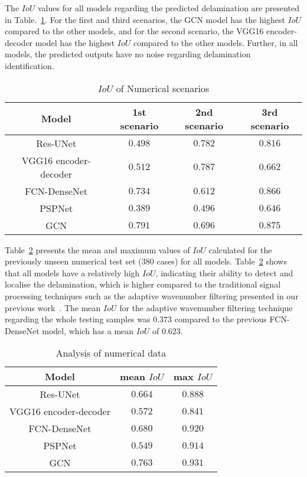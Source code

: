 \clearpage
The \(IoU\) values for all models regarding the predicted delamination are presented in Table.~\ref{tab:table_numerical_scenarios}.
For the first and third scenarios, the GCN model has the highest \(IoU\) compared to the other models, and for the second scenario, the VGG16 encoder-decoder model has the highest \(IoU\) compared to the other models.
Further, in all models, the predicted outputs have no noise regarding delamination identification.
\begin{table}[]
	\centering
	\caption{\(IoU\) of Numerical scenarios}
	\label{tab:table_numerical_scenarios}
	\resizebox{\textwidth}{!}
	{
		\begin{tabular}{cccc}\hline
			Model & 1st scenario & 2nd scenario & 3rd scenario \\ \hline
			Res-UNet & \(0.498\) & \(0.782\) & \(0.816\)  \\ 
			VGG16 encoder-decoder & \(0.512\) & \(0.787\)  & \(0.662\)  \\
			FCN-DenseNet & \(0.734\)  & \(0.612\)  & \(0.866\)  \\ 
			PSPNet & \(0.389\) & \(0.496\) & \(0.646\)  \\ 
			GCN & \(0.791\) & \(0.696\) & \(0.875\) \\ \hline
		\end{tabular}
	}
\end{table}
Table~\ref{tab:table_iou} presents the mean and maximum values of \(IoU\) calculated for the previously unseen numerical test set (380 cases) for all models.
Table~\ref{tab:table_iou} shows that all models have a relatively high \(IoU\), indicating their ability to detect and localise the delamination, which is higher compared to the traditional signal processing techniques such as the adaptive wavenumber filtering presented in our previous work~\cite{Ijjeh2021}. 
The mean \(IoU\) for the adaptive wavenumber filtering technique regarding the whole testing samples was \(0.373\) compared to the previous FCN-DenseNet model, which has a mean \(IoU\) of \(0.623\).
\begin{table}[]
	\centering
	\caption{Analysis of numerical data}
	\label{tab:table_iou}
	\begin{tabular}{ccc}\hline
		Model & mean \(IoU\) & max \(IoU\) \\ \hline
		Res-UNet & \(0.664\) & \(0.888\) \\ 
		VGG16 encoder-decoder & \(0.572\) & \(0.841\) \\ 
		FCN-DenseNet & \(0.680\) & \(0.920\) \\ 
		PSPNet & \(0.549\) & \(0.914\) \\ 
		GCN & \(0.763\) & \(0.931\) \\ \hline
	\end{tabular}
\end{table}
